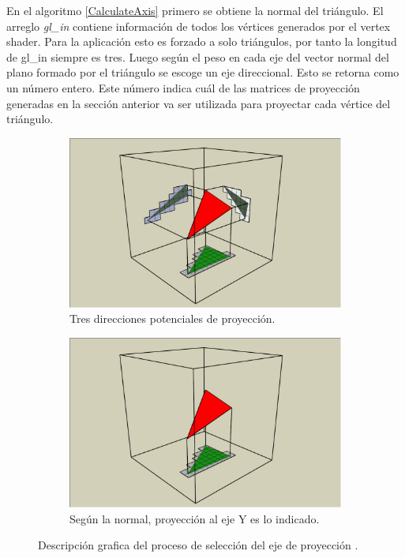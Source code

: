 En el algoritmo \ref{CalculateAxis} primero se obtiene la normal del triángulo. El arreglo \emph{gl\_in} contiene información de todos los vértices generados por el vertex shader. Para la aplicación esto es forzado a solo triángulos, por tanto la longitud de gl\_in siempre es tres. Luego según el peso en cada eje del vector normal del plano formado por el triángulo se escoge un eje direccional. Esto se retorna como un número entero. Este número indica cuál de las matrices de proyección generadas en la sección anterior va ser utilizada para proyectar cada vértice del triángulo.

\begin{figure}[H]
	\centering
	\begin{subfigure}[t]{.49\linewidth}
		\centering
		\captionsetup{justification=centering}
		\includegraphics[width=\linewidth]{media/Voxelization_blog_fig_5.png}
		\caption*{Tres direcciones potenciales de proyección.}
	\end{subfigure}%
	\hspace{0.01\textwidth}
	\begin{subfigure}[t]{.49\linewidth}
		\centering
		\captionsetup{justification=centering}
		\includegraphics[width=\linewidth]{media/Voxelization_blog_fig_6.png}
		\caption*{Según la normal, proyección al eje Y es lo indicado.}
	\end{subfigure}%
	\caption{Descripción grafica del proceso de selección del eje de proyección \cite{gpuvoxelization}.}
	\label{fig:axis_selection}
\end{figure}

